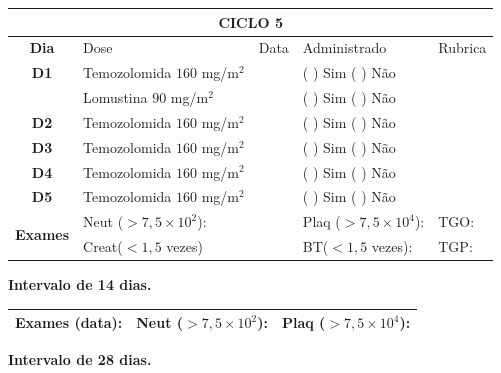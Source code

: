 \documentclass[11pt,a4paper,oldfontcommands]{memoir}
\begin{document}
\begin{center}
\begin{longtable}{p{1cm}p{4cm}|p{1cm}|p{4.6cm}|p{3cm}}
	\hline
	\multicolumn{5}{c}{\textbf{CICLO 5}}\\
\hline
    \multicolumn{1}{c|}{\multirow{1}{*}{\textbf{Dia}}}&{Dose}&{Data}&{Administrado}&{Rubrica} \\
    \hline
    \multicolumn{1}{c|}{\multirow{1}{*}{\textbf{D1}}}&{Temozolomida \(160\) mg/m\(^2\)}&&{(  ) Sim (  ) Não}&\\
    \multicolumn{1}{c|}{\multirow{1}{*}{\textbf{}}}&{Lomustina \(90\) mg/m\(^2\)}&&{(  ) Sim (  ) Não}&\\
    \multicolumn{1}{c|}{\multirow{1}{*}{\textbf{D2}}}&{Temozolomida \(160\) mg/m\(^2\)}&&{(  ) Sim (  ) Não}&\\
    \multicolumn{1}{c|}{\multirow{1}{*}{\textbf{D3}}}&{Temozolomida \(160\) mg/m\(^2\)}&&{(  ) Sim (  ) Não}&\\
    \multicolumn{1}{c|}{\multirow{1}{*}{\textbf{D4}}}&{Temozolomida \(160\) mg/m\(^2\)}&&{(  ) Sim (  ) Não}&\\
    \multicolumn{1}{c|}{\multirow{1}{*}{\textbf{D5}}}&{Temozolomida \(160\) mg/m\(^2\)}&&{(  ) Sim (  ) Não}&\\
    \hline
    \multicolumn{1}{c|}{\multirow{2}{*}{\textbf{Exames}}}&\multicolumn{2}{l|}{Neut (\(>7,5\times10^2\)):}&{Plaq (\(>7,5\times10^4\)):}&{TGO:}\\
    \cline{2-5}
    \multicolumn{1}{c|}{\multirow{2}{*}{{}}}&\multicolumn{2}{l|}{Creat(\(<1,5\) vezes)}&{BT(\(<1,5\) vezes):}&{TGP:}
    \\
    \hline
\end{longtable}
\textbf{Intervalo de 14 dias.}
\begin{longtable}{p{5cm}|p{5cm}|p{4.5cm}}
    \hline
    \textbf{Exames (data):}&{Neut (\(>7,5\times10^2\)):}&{Plaq (\(>7,5\times10^4\)):}
    \\
    \hline
\end{longtable}
\textbf{Intervalo de 28 dias.}
\\[1.5cm]
\end{center}
\end{document}

